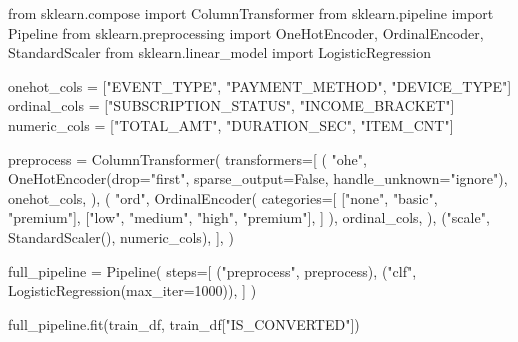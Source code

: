 \documentclass[
  letterpaper,
  DIV=11,
  numbers=noendperiod]{scrreprt}
\newenvironment{Shaded}{\begin{snugshade}}{\end{snugshade}}
\newcommand{\DecValTok}[1]{\textcolor[rgb]{0.68,0.00,0.00}{#1}}
\newcommand{\ImportTok}[1]{\textcolor[rgb]{0.00,0.46,0.62}{#1}}
\newcommand{\NormalTok}[1]{\textcolor[rgb]{0.00,0.23,0.31}{#1}}
\newcommand{\OperatorTok}[1]{\textcolor[rgb]{0.37,0.37,0.37}{#1}}
\newcommand{\StringTok}[1]{\textcolor[rgb]{0.13,0.47,0.30}{#1}}
\newcommand{\VariableTok}[1]{\textcolor[rgb]{0.07,0.07,0.07}{#1}}
\begin{document}
\begin{Shaded}
\begin{Highlighting}[]
\ImportTok{from}\NormalTok{ sklearn.compose }\ImportTok{import}\NormalTok{ ColumnTransformer}
\ImportTok{from}\NormalTok{ sklearn.pipeline }\ImportTok{import}\NormalTok{ Pipeline}
\ImportTok{from}\NormalTok{ sklearn.preprocessing }\ImportTok{import}\NormalTok{ OneHotEncoder, OrdinalEncoder, StandardScaler}
\ImportTok{from}\NormalTok{ sklearn.linear\_model }\ImportTok{import}\NormalTok{ LogisticRegression}

\NormalTok{onehot\_cols }\OperatorTok{=}\NormalTok{ [}\StringTok{"EVENT\_TYPE"}\NormalTok{, }\StringTok{"PAYMENT\_METHOD"}\NormalTok{, }\StringTok{"DEVICE\_TYPE"}\NormalTok{]}
\NormalTok{ordinal\_cols }\OperatorTok{=}\NormalTok{ [}\StringTok{"SUBSCRIPTION\_STATUS"}\NormalTok{, }\StringTok{"INCOME\_BRACKET"}\NormalTok{]}
\NormalTok{numeric\_cols }\OperatorTok{=}\NormalTok{ [}\StringTok{"TOTAL\_AMT"}\NormalTok{, }\StringTok{"DURATION\_SEC"}\NormalTok{, }\StringTok{"ITEM\_CNT"}\NormalTok{]}

\NormalTok{preprocess }\OperatorTok{=}\NormalTok{ ColumnTransformer(}
\NormalTok{    transformers}\OperatorTok{=}\NormalTok{[}
\NormalTok{        (}
            \StringTok{"ohe"}\NormalTok{,}
\NormalTok{            OneHotEncoder(drop}\OperatorTok{=}\StringTok{"first"}\NormalTok{, sparse\_output}\OperatorTok{=}\VariableTok{False}\NormalTok{, handle\_unknown}\OperatorTok{=}\StringTok{"ignore"}\NormalTok{),}
\NormalTok{            onehot\_cols,}
\NormalTok{        ),}
\NormalTok{        (}
            \StringTok{"ord"}\NormalTok{,}
\NormalTok{            OrdinalEncoder(}
\NormalTok{                categories}\OperatorTok{=}\NormalTok{[}
\NormalTok{                    [}\StringTok{"none"}\NormalTok{, }\StringTok{"basic"}\NormalTok{, }\StringTok{"premium"}\NormalTok{],}
\NormalTok{                    [}\StringTok{"low"}\NormalTok{, }\StringTok{"medium"}\NormalTok{, }\StringTok{"high"}\NormalTok{, }\StringTok{"premium"}\NormalTok{],}
\NormalTok{                ]}
\NormalTok{            ),}
\NormalTok{            ordinal\_cols,}
\NormalTok{        ),}
\NormalTok{        (}\StringTok{"scale"}\NormalTok{, StandardScaler(), numeric\_cols),}
\NormalTok{    ],}
\NormalTok{)}

\NormalTok{full\_pipeline }\OperatorTok{=}\NormalTok{ Pipeline(}
\NormalTok{    steps}\OperatorTok{=}\NormalTok{[}
\NormalTok{        (}\StringTok{"preprocess"}\NormalTok{, preprocess),}
\NormalTok{        (}\StringTok{"clf"}\NormalTok{, LogisticRegression(max\_iter}\OperatorTok{=}\DecValTok{1000}\NormalTok{)),}
\NormalTok{    ]}
\NormalTok{)}

\NormalTok{full\_pipeline.fit(train\_df, train\_df[}\StringTok{"IS\_CONVERTED"}\NormalTok{])}
\end{Highlighting}
\end{Shaded}
\end{document}
